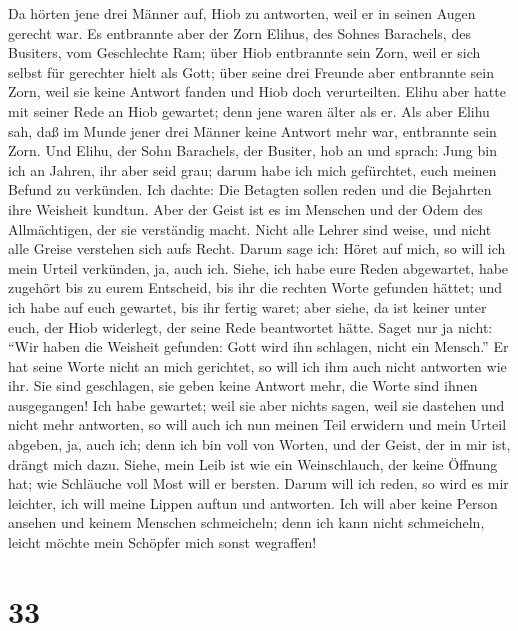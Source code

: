  Da hörten jene drei Männer auf, Hiob zu antworten, weil
er in seinen Augen gerecht war.  Es entbrannte aber der
Zorn Elihus, des Sohnes Barachels, des Busiters, vom Geschlechte Ram;
über Hiob entbrannte sein Zorn, weil er sich selbst für gerechter hielt
als Gott;  über seine drei Freunde aber entbrannte sein
Zorn, weil sie keine Antwort fanden und Hiob doch verurteilten.
 Elihu aber hatte mit seiner Rede an Hiob gewartet; denn
jene waren älter als er.  Als aber Elihu sah, daß im Munde
jener drei Männer keine Antwort mehr war, entbrannte sein Zorn.
 Und Elihu, der Sohn Barachels, der Busiter, hob an und
sprach: Jung bin ich an Jahren, ihr aber seid grau; darum habe ich mich
gefürchtet, euch meinen Befund zu verkünden.  Ich dachte:
Die Betagten sollen reden und die Bejahrten ihre Weisheit kundtun.
 Aber der Geist ist es im Menschen und der Odem des
Allmächtigen, der sie verständig macht.  Nicht alle Lehrer
sind weise, und nicht alle Greise verstehen sich aufs Recht.
 Darum sage ich: Höret auf mich, so will ich mein Urteil
verkünden, ja, auch ich.  Siehe, ich habe eure Reden
abgewartet, habe zugehört bis zu eurem Entscheid, bis ihr die rechten
Worte gefunden hättet;  und ich habe auf euch gewartet,
bis ihr fertig waret; aber siehe, da ist keiner unter euch, der Hiob
widerlegt, der seine Rede beantwortet hätte.  Saget nur
ja nicht: ``Wir haben die Weisheit gefunden: Gott wird ihn schlagen,
nicht ein Mensch.''  Er hat seine Worte nicht an mich
gerichtet, so will ich ihm auch nicht antworten wie ihr. 
Sie sind geschlagen, sie geben keine Antwort mehr, die Worte sind ihnen
ausgegangen!  Ich habe gewartet; weil sie aber nichts
sagen, weil sie dastehen und nicht mehr antworten,  so
will auch ich nun meinen Teil erwidern und mein Urteil abgeben, ja, auch
ich;  denn ich bin voll von Worten, und der Geist, der in
mir ist, drängt mich dazu.  Siehe, mein Leib ist wie ein
Weinschlauch, der keine Öffnung hat; wie Schläuche voll Most will er
bersten.  Darum will ich reden, so wird es mir leichter,
ich will meine Lippen auftun und antworten.  Ich will
aber keine Person ansehen und keinem Menschen schmeicheln;
 denn ich kann nicht schmeicheln, leicht möchte mein
Schöpfer mich sonst wegraffen!

\hypertarget{section-32}{%
\section{33}\label{section-32}}

